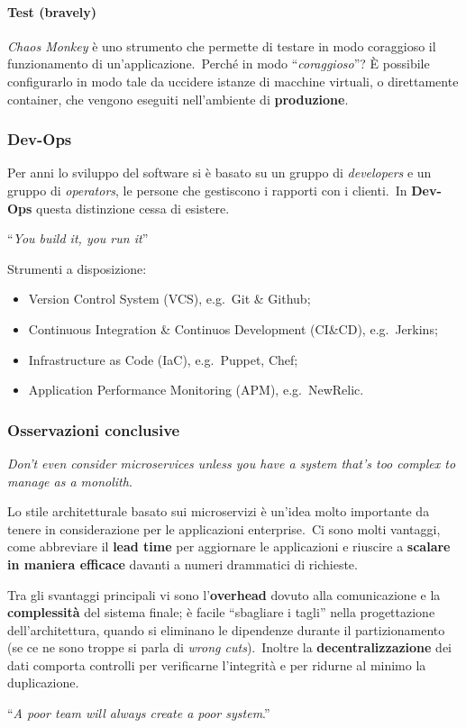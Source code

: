 \paragraph{Test (bravely)}

\textit{Chaos Monkey} è uno strumento che permette di testare in modo coraggioso il funzionamento di un'applicazione.\
Perché in modo ``\textit{coraggioso}''?
È possibile configurarlo in modo tale da uccidere istanze di macchine virtuali, o direttamente container, che vengono eseguiti nell'ambiente di \textbf{produzione}.\

\subsubsection{Dev-Ops}

Per anni lo sviluppo del software si è basato su un gruppo di \textit{developers} e un gruppo di \textit{operators}, le persone che gestiscono i rapporti con i clienti.\
In \textbf{Dev-Ops} questa distinzione cessa di esistere.\

\begin{center}
	``\textit{You build it, you run it}''
\end{center}

\noindent Strumenti a disposizione:
\begin{itemize}
	\item Version Control System (VCS), e.g.\ Git \& Github;
	\item Continuous Integration \& Continuos Development (CI{\&}CD), e.g.\ Jerkins;
	\item Infrastructure as Code (IaC), e.g.\ Puppet, Chef;
	\item Application Performance Monitoring (APM), e.g.\ NewRelic.
\end{itemize}


\subsubsection{Osservazioni conclusive}

\textit{Don't even consider microservices unless you have a system that's too complex to manage as a monolith}.\qquad [M.\ Fowler]
\vspace{12pt}

\noindent Lo stile architetturale basato sui microservizi è un'idea molto importante da tenere in considerazione per le applicazioni enterprise.\
Ci sono molti vantaggi, come abbreviare il \textbf{lead time} per aggiornare le applicazioni e riuscire a \textbf{scalare in maniera efficace} davanti a numeri drammatici di richieste.\

Tra gli svantaggi principali vi sono l'\textbf{overhead} dovuto alla comunicazione e la \textbf{complessità} del sistema finale; è facile ``sbagliare i tagli'' nella progettazione dell'architettura, quando si eliminano le dipendenze durante il  partizionamento (se ce ne sono troppe si parla di \textit{wrong cuts}).\
Inoltre la \textbf{decentralizzazione} dei dati comporta controlli per verificarne l'integrità e per ridurne al minimo la duplicazione.\

\begin{center}
	``\textit{A poor team will always create a poor system}.''
\end{center}
